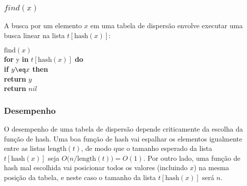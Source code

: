 \documentclass{beamer}
\begin{document}
\begin{frame}
\frametitle{$find(x)$}

A busca por um elemento $ \ensuremath{x}$ em uma tabela de dispersão envolve executar uma busca linear na lista $ \ensuremath{t[\mathrm{hash}(x)]}$: 

\begin{oframed}
\begin{flushleft}
\hspace*{1em} \ensuremath{\mathrm{find}(x)}\\
\hspace*{1em} \hspace*{1em} {\color{black} \textbf{for}} y {\color{black} \textbf{in}} \ensuremath{t[\mathrm{hash}(x)]} {\color{black} \textbf{do}} \\
\hspace*{1em} \hspace*{1em} \hspace*{1em} {\color{black} \textbf{if}} \ensuremath{y \eq x} {\color{black} \textbf{then}} \\
\hspace*{1em} \hspace*{1em} \hspace*{1em} \hspace*{1em} {\color{black} \textbf{return}} \ensuremath{y}\\
\hspace*{1em} \hspace*{1em} {\color{black} \textbf{return}} \ensuremath{\ensuremath{\mathit{nil}}}\\
\end{flushleft}
\end{oframed}
\end{frame}

\begin{frame}
\frametitle{Desempenho}

O desempenho de uma tabela de dispersão depende criticamente da escolha da função de hash. Uma boa função de hash vai espalhar os elementos igualmente entre as listas $ \ensuremath{\mathrm{length}(t)}$, de modo que o tamanho esperado da lista $ \ensuremath{t[\mathrm{hash}(x)]}$ seja $ O(\ensuremath{\ensuremath{n}}/\ensuremath{\ensuremath{\mathrm{length}(t)})} = O(1)$. Por outro lado, uma função de hash mal escolhida vai posicionar todos os valores (incluindo $ \ensuremath{x}$) na mesma posição da tabela, e neste caso o tamanho da lista $ \ensuremath{t[\mathrm{hash}(x)]}$ será $n$. 

\end{frame}
\end{document}

